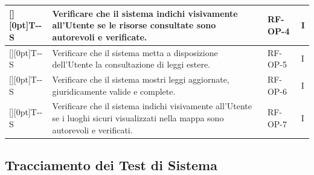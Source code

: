 \documentclass[a4paper,12pt]{article}
\newcounter{testsys}
\newcommand{\systestcode}{%
  \raisebox{0pt}[\height][0pt]{\hypertarget{T-\arabic{testsys}-S}{}}T-\arabic{testsys}-S%
}
\begin{document}
\begin{longtable}{| >{\centering\arraybackslash}p{} | >{\raggedright\arraybackslash}p{} | >{\centering\arraybackslash}p{} | >{\centering\arraybackslash}p{} |}
\stepcounter{testsys} \systestcode & Verificare che il sistema indichi visivamente all'Utente se le risorse consultate sono autorevoli e verificate. & RF-OP-4 & I \\
\hline

\stepcounter{testsys} \systestcode & Verificare che il sistema metta a disposizione dell'Utente la consultazione di leggi estere. & RF-OP-5 & I \\
\hline

\stepcounter{testsys} \systestcode & Verificare che il sistema mostri leggi aggiornate, giuridicamente valide e complete. & RF-OP-6 & I \\
\hline

\stepcounter{testsys} \systestcode & Verificare che il sistema indichi visivamente all'Utente se i luoghi sicuri visualizzati nella mappa sono autorevoli e verificati. & RF-OP-7 & I \\
\hline
\end{longtable}
\endgroup


\setcounter{testsys}{0}
\begingroup
\subsection{Tracciamento dei Test di Sistema} \label{subsection:tracciamento_test_sistema}
\renewcommand{\arraystretch}{1.5}
\end{document}
